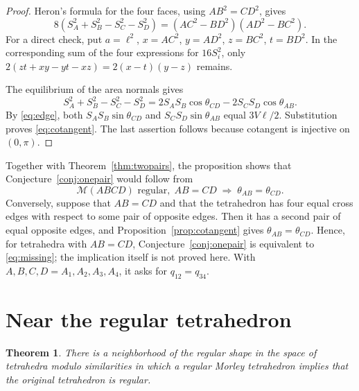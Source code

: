 \documentclass[11pt]{article}
\newtheorem{theorem}{Theorem}[section]
\theoremstyle{definition}
\theoremstyle{remark}
\newcommand{\M}{\mathcal M}
\begin{document}
\begin{proof}
Heron's formula for the four faces, using $AB^2=CD^2$, gives
\[
8(S_A^2+S_B^2-S_C^2-S_D^2)
=(AC^2-BD^2)(AD^2-BC^2).
\]
For a direct check, put $a=\ell^2$, $x=AC^2$, $y=AD^2$, $z=BC^2$, $t=BD^2$. In the corresponding sum of the four expressions for $16S_i^2$, only $2(zt+xy-yt-xz)=2(x-t)(y-z)$ remains.

The equilibrium of the area normals gives
\[
S_A^2+S_B^2-S_C^2-S_D^2
=2S_AS_B\cos\theta_{CD}-2S_CS_D\cos\theta_{AB}.
\]
By \eqref{eq:edge}, both $S_AS_B\sin\theta_{CD}$ and $S_CS_D\sin\theta_{AB}$ equal $3V\ell/2$. Substitution proves \eqref{eq:cotangent}. The last assertion follows because cotangent is injective on $(0,\pi)$.
\end{proof}

Together with Theorem~\ref{thm:twopairs}, the proposition shows that Conjecture~\ref{conj:onepair} would follow from
\begin{equation}
\M(ABCD)\text{ regular},\; AB=CD
\;\Longrightarrow\; \theta_{AB}=\theta_{CD}.
\label{eq:missing}
\end{equation}
Conversely, suppose that $AB=CD$ and that the tetrahedron has four equal cross edges with respect to some pair of opposite edges. Then it has a second pair of equal opposite edges, and Proposition~\ref{prop:cotangent} gives $\theta_{AB}=\theta_{CD}$. Hence, for tetrahedra with $AB=CD$, Conjecture~\ref{conj:onepair} is equivalent to \eqref{eq:missing}; the implication itself is not proved here. With $A,B,C,D=A_1,A_2,A_3,A_4$, it asks for $q_{12}=q_{34}$.

\section{Near the regular tetrahedron}\label{sec:nearregular}

\begin{theorem}
\label{thm:localregular}
There is a neighborhood of the regular shape in the space of tetrahedra modulo similarities in which a regular Morley tetrahedron implies that the original tetrahedron is regular.
\end{theorem}
\end{document}
